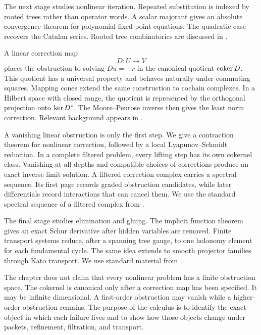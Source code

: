 The next stage studies nonlinear iteration.  Repeated substitution is indexed by rooted trees rather than operator words.  A scalar majorant gives an absolute convergence theorem for polynomial fixed-point equations.  The quadratic case recovers the Catalan series.  Rooted tree combinatorics are discussed in \cite{Stanley2012,LodayVallette2012,HairerLubichWanner2006}.

A linear correction map
\[
D:U\longrightarrow V
\]
places the obstruction to solving $Du=-r$ in the canonical quotient $\operatorname{coker} D$.  This quotient has a universal property and behaves naturally under commuting squares.  Mapping cones extend the same construction to cochain complexes.  In a Hilbert space with closed range, the quotient is represented by the orthogonal projection onto $\operatorname{ker} D^*$.  The Moore--Penrose inverse then gives the least norm correction.  Relevant background appears in \cite{Weibel1994,Penrose1955}.

A vanishing linear obstruction is only the first step.  We give a contraction theorem for nonlinear correction, followed by a local Lyapunov--Schmidt reduction.  In a complete filtered problem, every lifting step has its own cokernel class.  Vanishing at all depths and compatible choices of corrections produce an exact inverse limit solution.  A filtered correction complex carries a spectral sequence.  Its first page records graded obstruction candidates, while later differentials record interactions that can cancel them.  We use the standard spectral sequence of a filtered complex from \cite{Weibel1994,McCleary2001}.

The final stage studies elimination and gluing.  The implicit function theorem gives an exact Schur derivative after hidden variables are removed.  Finite transport systems reduce, after a spanning tree gauge, to one holonomy element for each fundamental cycle.  The same idea extends to smooth projector families through Kato transport.  We use standard material from \cite{Deimling1985,GrossTucker1987,Kato1950,Kato1995,KobayashiNomizu1963}.

The chapter does not claim that every nonlinear problem has a finite obstruction space.  The cokernel is canonical only after a correction map has been specified.  It may be infinite dimensional.  A first-order obstruction may vanish while a higher-order obstruction remains.  The purpose of the calculus is to identify the exact object in which each failure lives and to show how those objects change under packets, refinement, filtration, and transport.



